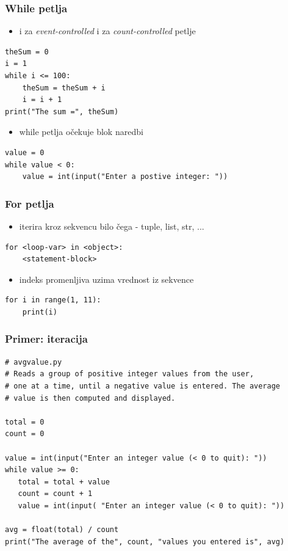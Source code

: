 \documentclass[compress]{beamer}
\begin{document}
\begin{frame}[fragile]
\frametitle{While petlja}
\begin{itemize}
  \item i za \emph{event-controlled} i za \emph{count-controlled} petlje
\end{itemize}
\begin{verbatim}
theSum = 0
i = 1
while i <= 100:
    theSum = theSum + i
    i = i + 1
print("The sum =", theSum)
\end{verbatim}
\begin{itemize}
  \item while petlja očekuje blok naredbi
\end{itemize}
\begin{verbatim}
value = 0
while value < 0:
    value = int(input("Enter a postive integer: "))
\end{verbatim}
\end{frame}

\begin{frame}[fragile]
\frametitle{For petlja}
\begin{itemize}
  \item iterira kroz sekvencu bilo čega - tuple, list, str, ...
\end{itemize}
\begin{verbatim}
for <loop-var> in <object>:
    <statement-block>
\end{verbatim}
\begin{itemize}
  \item indeks promenljiva uzima vrednost iz sekvence
\end{itemize}
\begin{verbatim}
for i in range(1, 11):
    print(i)
\end{verbatim}
\end{frame}

\begin{frame}[fragile]
\frametitle{Primer: iteracija}
\begin{verbatim}
# avgvalue.py
# Reads a group of positive integer values from the user,
# one at a time, until a negative value is entered. The average
# value is then computed and displayed.

total = 0
count = 0

value = int(input("Enter an integer value (< 0 to quit): "))
while value >= 0:
   total = total + value
   count = count + 1
   value = int(input( "Enter an integer value (< 0 to quit): "))
   
avg = float(total) / count
print("The average of the", count, "values you entered is", avg)
\end{verbatim}
\end{frame}
\end{document}
